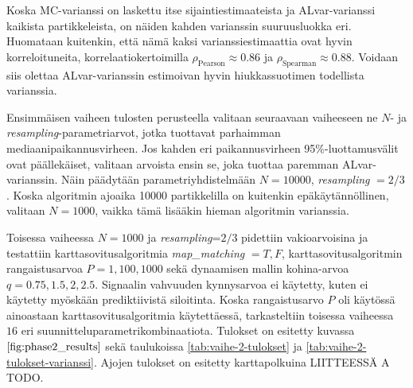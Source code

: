 \documentclass[
  12pt,
  a4paper, twoside]{book}
\begin{document}
Koska MC-varianssi on laskettu itse sijaintiestimaateista ja ALvar-varianssi kaikista partikkeleista, on näiden kahden varianssin suuruusluokka eri. Huomataan kuitenkin, että nämä kaksi varianssiestimaattia ovat hyvin korreloituneita, korrelaatiokertoimilla \(\rho_\text{Pearson} \approx 0.86\) ja \(\rho_\text{Spearman} \approx 0.88\). Voidaan siis olettaa ALvar-varianssin estimoivan hyvin hiukkassuotimen todellista varianssia.

Ensimmäisen vaiheen tulosten perusteella valitaan seuraavaan vaiheeseen ne \(N\)- ja \emph{resampling}-parametriarvot, jotka tuottavat parhaimman mediaanipaikannusvirheen. Jos kahden eri paikannusvirheen 95\%-luottamusvälit ovat päällekäiset, valitaan arvoista ensin se, joka tuottaa paremman ALvar-varianssin. Näin päädytään parametriyhdistelmään \(N=10000\), \emph{resampling} \(=2/3\). Koska algoritmin ajoaika 10000 partikkelilla on kuitenkin epäkäytännöllinen, valitaan \(N=1000\), vaikka tämä lisääkin hieman algoritmin varianssia.

Toisessa vaiheessa \(N=1000\) ja \emph{resampling}=\(2/3\) pidettiin vakioarvoisina ja testattiin karttasovitusalgoritmia \emph{map\_matching} \(={T,F}\), karttasovitusalgoritmin rangaistusarvoa \(P={1,100,1000}\) sekä dynaamisen mallin kohina-arvoa \(q={0.75,1.5,2,2.5}\). Signaalin vahvuuden kynnysarvoa ei käytetty, kuten ei käytetty myöskään prediktiivistä siloitinta. Koska rangaistusarvo \(P\) oli käytössä ainoastaan karttasovitusalgoritmia käytettäessä, tarkasteltiin toisessa vaiheessa \(16\) eri suunnitteluparametrikombinaatiota. Tulokset on esitetty kuvassa \(\ref{fig:phase2_results}\) sekä taulukoissa \ref{tab:vaihe-2-tulokset} ja \ref{tab:vaihe-2-tulokset-varianssi}. Ajojen tulokset on esitetty karttapolkuina LIITTEESSÄ A TODO.
\end{document}
